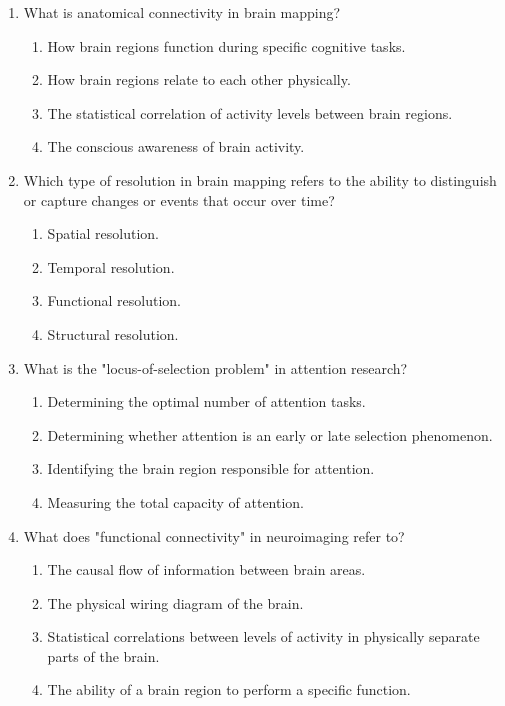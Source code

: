 \documentclass{article}
\begin{document}
\begin{enumerate}[label=\arabic*.]
\item What is anatomical connectivity in brain mapping?
\begin{enumerate}[label=(\alph*)]
    \item How brain regions function during specific cognitive tasks.
    \item How brain regions relate to each other physically.
    \item The statistical correlation of activity levels between brain regions.
    \item The conscious awareness of brain activity.
\end{enumerate}

\item Which type of resolution in brain mapping refers to the ability to distinguish or capture changes or events that occur over time?
\begin{enumerate}[label=(\alph*)]
    \item Spatial resolution.
    \item Temporal resolution.
    \item Functional resolution.
    \item Structural resolution.
\end{enumerate}

\item What is the "locus-of-selection problem" in attention research?
\begin{enumerate}[label=(\alph*)]
    \item Determining the optimal number of attention tasks.
    \item Determining whether attention is an early or late selection phenomenon.
    \item Identifying the brain region responsible for attention.
    \item Measuring the total capacity of attention.
\end{enumerate}

\item What does "functional connectivity" in neuroimaging refer to?
\begin{enumerate}[label=(\alph*)]
    \item The causal flow of information between brain areas.
    \item The physical wiring diagram of the brain.
    \item Statistical correlations between levels of activity in physically separate parts of the brain.
    \item The ability of a brain region to perform a specific function.
\end{enumerate}


\end{enumerate}
\end{document}

